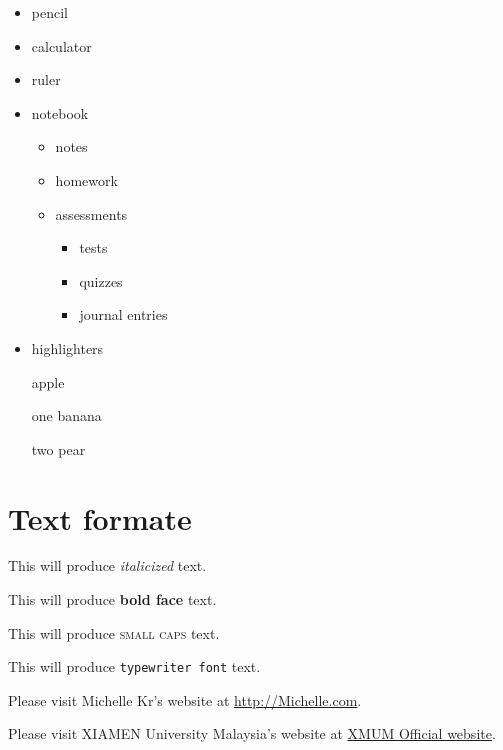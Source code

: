 \documentclass[12pt, a4paper]{article}
\begin{document}
\vspace{1cm}

\begin{itemize}
    \item pencil
    \item calculator
    \item ruler
    \item notebook
        \begin{itemize}
            \item notes
            \item homework
            \item assessments
            \begin{itemize}
                \item tests
                \item quizzes
                \item journal entries
            \end{itemize}
        \end{itemize}
    \item highlighters
\end{itemize}

\vspace{1cm}

\begin{enumerate}
    \item []apple
    \item [one]banana
    \item [two]pear
\end{enumerate}

\section{Text formate}

This will produce \textit{italicized} text.

This will produce \textbf{bold face} text.

This will produce \textsc{small caps} text.

This will produce \texttt{typewriter font} text.

Please visit Michelle Kr's website at 
\url{http://Michelle.com}.

Please visit XIAMEN University Malaysia's website at 
\href{https://www.xmu.edu.my/}{XMUM Official website}.

\vspace{2cm}
\end{document}
